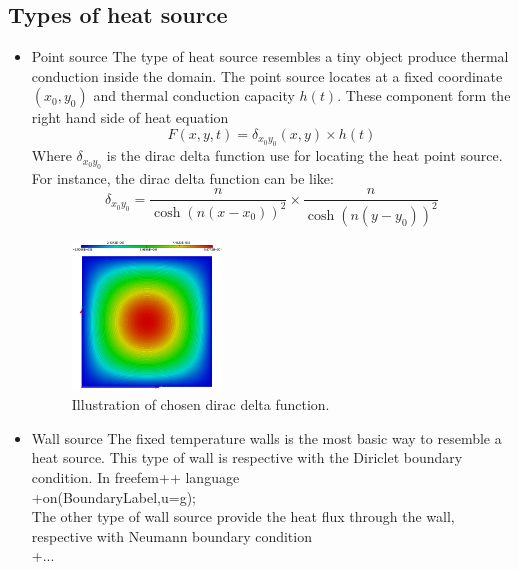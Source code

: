 \subsection{Types of heat source}
\begin{itemize}
	\item Point source
	The type of heat source resembles a tiny object produce thermal conduction inside the domain. The point source locates at a fixed coordinate $(x_0,y_0)$ and thermal conduction capacity $h(t)$. These component form the right hand side of heat equation
	$$
	F(x,y,t) = \delta_{x_0 y_0}(x,y)\times h(t)
	$$
	Where $\delta_{x_0 y_0}$ is the dirac delta function use for locating the heat point source. For instance, the dirac delta function can be like:
	$$
	\delta_{x_0 y_0} = \dfrac{n}{\cosh(n(x-x_0))^2}\times\dfrac{n}{\cosh(n(y-y_0))^2}
	$$
	\begin{figure}[ht]
		\centering
		\includegraphics[width=4cm]{dirac}
		\caption{Illustration of chosen dirac delta function.}
	\end{figure}
	\item Wall source
	The fixed temperature walls is the most basic way to resemble a heat source. This type of wall is respective with the Diriclet boundary condition. In freefem++ language\\
	+on(BoundaryLabel,u=g);\\
	The other type of wall source provide the heat flux through the wall, respective with Neumann boundary condition\\
	+...\\
\end{itemize}